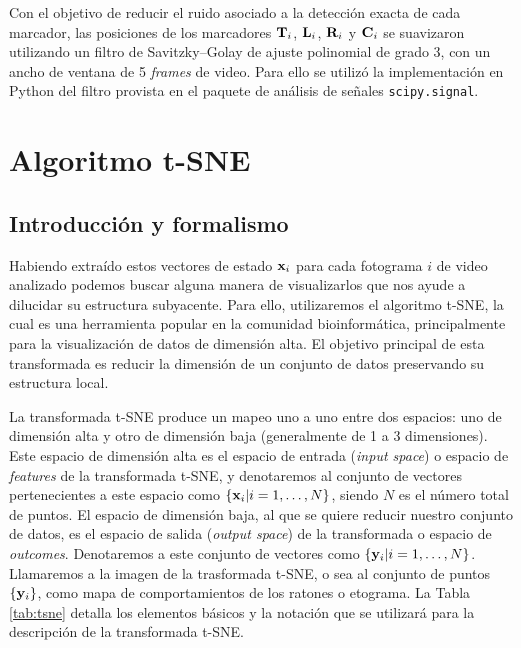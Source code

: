 Con el objetivo de reducir el ruido asociado a la detección exacta de cada marcador, las posiciones de los marcadores $\vb{T}_i$, $\vb{L}_i$, $\vb{R}_i$ y $\vb{C}_i$ se suavizaron utilizando un filtro de Savitzky–Golay \cite{sav_gol} de ajuste polinomial de grado 3, con un ancho de ventana de 5 \textit{frames} de video. Para ello se utilizó la implementación en Python del filtro provista en el paquete de análisis de señales \texttt{scipy.signal}.

\section{Algoritmo t-SNE}\label{sec:tsne}

\subsection{Introducción y formalismo}\label{subsec:tsne_elementos}

Habiendo extraído estos vectores de estado $\vb{x}_i$ para cada fotograma $i$ de video analizado podemos buscar alguna manera de visualizarlos que nos ayude a dilucidar su estructura subyacente. Para ello, utilizaremos el algoritmo t-SNE, la cual es una herramienta popular en la comunidad bioinformática, principalmente para la visualización de datos de dimensión alta. El objetivo principal de esta transformada es reducir la dimensión de un conjunto de datos preservando su estructura local.

La transformada t-SNE produce un mapeo uno a uno entre dos espacios: uno de dimensión alta y otro de dimensión baja (generalmente de 1 a 3 dimensiones). Este espacio de dimensión alta es el espacio de entrada (\textit{input space}) o espacio de \textit{features} de la transformada t-SNE, y denotaremos al conjunto de vectores pertenecientes a este espacio como $\{\vb{x}_i|i= 1,\dots, N\}$, siendo $N$ es el número total de puntos. El espacio de dimensión baja, al que se quiere reducir nuestro conjunto de datos, es el espacio de salida (\textit{output space}) de la transformada o espacio de \textit{outcomes}. Denotaremos a este conjunto de vectores como $\{\vb{y}_i|i= 1,\dots, N\}$. Llamaremos a la imagen de la trasformada t-SNE, o sea al conjunto de puntos $\{\vb{y}_i\}$, como mapa de comportamientos de los ratones o etograma. La Tabla \ref{tab:tsne} detalla los elementos básicos y la notación que se utilizará para la descripción de la transformada t-SNE.

